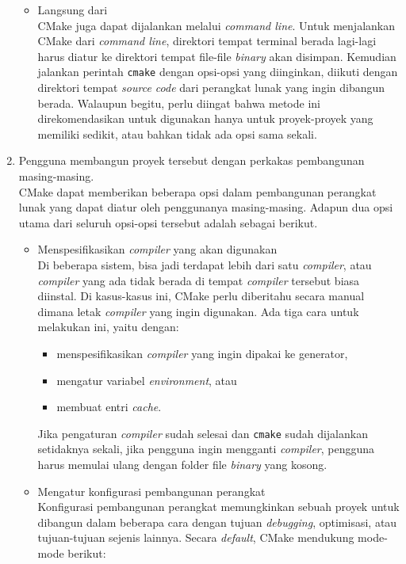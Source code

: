 \begin{enumerate}
\begin{itemize}
		\item Langsung dari \cl\\
		CMake juga dapat dijalankan melalui \textit{command line}. Untuk menjalankan CMake dari \textit{command line}, direktori tempat terminal berada lagi-lagi harus diatur ke direktori tempat file-file \textit{binary} akan disimpan. Kemudian jalankan perintah \verb|cmake| dengan opsi-opsi yang diinginkan, diikuti dengan direktori tempat \textit{source code} dari perangkat lunak yang ingin dibangun berada. Walaupun begitu, perlu diingat bahwa metode ini direkomendasikan untuk digunakan hanya untuk proyek-proyek yang memiliki sedikit, atau bahkan tidak ada opsi sama sekali.
	\end{itemize}
	
	\item Pengguna membangun proyek tersebut dengan perkakas pembangunan masing-masing.\\
	CMake dapat memberikan beberapa opsi dalam pembangunan perangkat lunak yang dapat diatur oleh penggunanya masing-masing. Adapun dua opsi utama dari seluruh opsi-opsi tersebut adalah sebagai berikut.
	
	\begin{itemize}
		\item Menspesifikasikan \textit{compiler} yang akan digunakan\\
		Di beberapa sistem, bisa jadi terdapat lebih dari satu \textit{compiler}, atau \textit{compiler} yang ada tidak berada di tempat \textit{compiler} tersebut biasa diinstal. Di kasus-kasus ini, CMake perlu diberitahu secara manual dimana letak \textit{compiler} yang ingin digunakan. Ada tiga cara untuk melakukan ini, yaitu dengan:
		
		\begin{itemize}
			\item menspesifikasikan \textit{compiler} yang ingin dipakai ke generator,
			\item mengatur variabel \textit{environment}, atau
			\item membuat entri \textit{cache}.
		\end{itemize}
		
		Jika pengaturan \textit{compiler} sudah selesai dan \verb|cmake| sudah dijalankan setidaknya sekali, jika pengguna ingin mengganti \textit{compiler}, pengguna harus memulai ulang dengan folder file \textit{binary} yang kosong.
		\item Mengatur konfigurasi pembangunan perangkat\\
		Konfigurasi pembangunan perangkat memungkinkan sebuah proyek untuk dibangun dalam beberapa cara dengan tujuan \textit{debugging}, optimisasi, atau tujuan-tujuan sejenis lainnya. Secara \textit{default}, CMake mendukung mode-mode berikut:
		

\end{itemize}
\end{enumerate}
